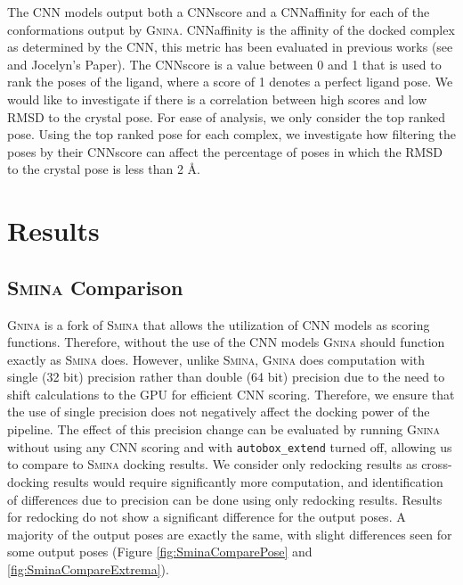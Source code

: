 \documentclass[journal=jcisd8,manuscript=article]{achemso}
\begin{document}
The CNN models output both a CNNscore and a CNNaffinity for each of the conformations output by \textsc{Gnina}. CNNaffinity is the affinity of the docked complex as determined by the CNN, this metric has been evaluated in previous works (see \citet{francoeur2020three} and Jocelyn's Paper). The CNNscore is a value between 0 and 1 that is used to rank the poses of the ligand, where a score of 1 denotes a perfect ligand pose. We would like to investigate if there is a correlation between high scores and low RMSD to the crystal pose. For ease of analysis, we only consider the top ranked pose. Using the top ranked pose for each complex, we investigate how filtering the poses by their CNNscore can affect the percentage of poses in which the RMSD to the crystal pose is less than 2 \AA.

\section{Results}
\subsection{{\normalfont\scshape Smina} Comparison}
\textsc{Gnina} is a fork of \textsc{Smina} that allows the utilization of CNN models as scoring functions. Therefore, without the use of the CNN models \textsc{Gnina} should function exactly as \textsc{Smina} does. However, unlike \textsc{Smina}, \textsc{Gnina} does computation with single (32 bit) precision rather than double (64 bit) precision due to the need to shift calculations to the GPU for efficient CNN scoring. Therefore, we ensure that the use of single precision does not negatively affect the docking power of the pipeline. The effect of this precision change can be evaluated by running \textsc{Gnina} without using any CNN scoring and with \texttt{autobox\_extend} turned off, allowing us to compare to \textsc{Smina} docking results. We consider only redocking results as cross-docking results would require significantly more computation, and identification of differences due to precision can be done using only redocking results. Results for redocking do not show a significant difference for the output poses. A majority of the output poses are exactly the same, with slight differences seen for some output poses (Figure \ref{fig:SminaComparePose} and \ref{fig:SminaCompareExtrema}).
\end{document}
